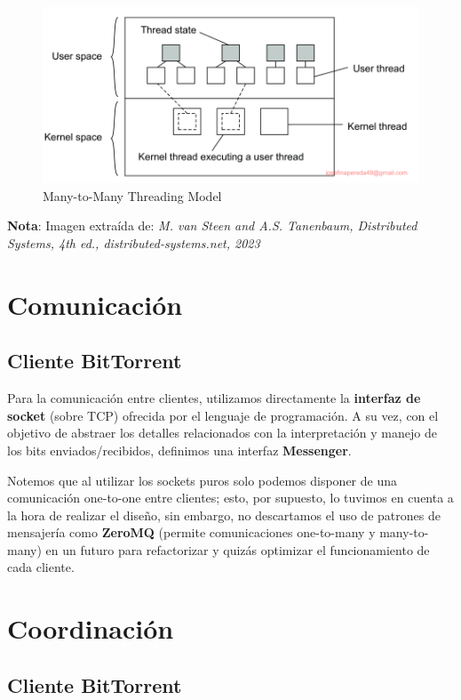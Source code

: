 \documentclass{article}
\begin{document}
\begin{figure}[h!]
    \centering
    \includegraphics[width=\textwidth]{./images/many_to_many_threading.png}
    \caption{Many-to-Many Threading Model}
    \label{fig:many_to_many_threading}
\end{figure}

\textbf{Nota}: Imagen extraída de: \textit{M. van Steen and A.S. Tanenbaum, Distributed Systems, 4th ed., distributed-systems.net, 2023}

\section{Comunicación}

\subsection{Cliente BitTorrent}

Para la comunicación entre clientes, utilizamos directamente la \textbf{interfaz de socket} (sobre TCP) ofrecida por el lenguaje de programación. A su vez, con el objetivo de abstraer los detalles relacionados con la interpretación y manejo de los bits enviados/recibidos, definimos una interfaz \textbf{Messenger}.

Notemos que al utilizar los sockets puros solo podemos disponer de una comunicación one-to-one entre clientes; esto, por supuesto, lo tuvimos en cuenta a la hora de realizar el diseño, sin embargo, no descartamos el uso de patrones de mensajería como \textbf{ZeroMQ} (permite comunicaciones one-to-many y many-to-many) en un futuro para refactorizar y quizás optimizar el funcionamiento de cada cliente.

\section{Coordinación}

\subsection{Cliente BitTorrent}
\end{document}
